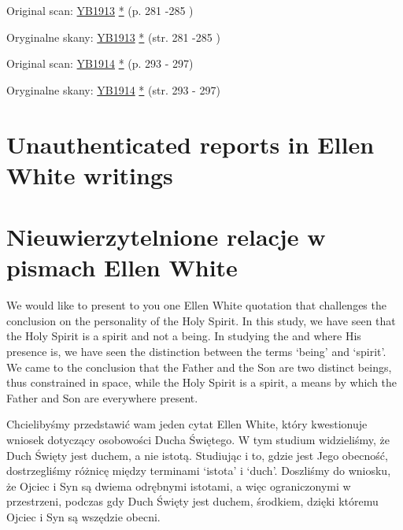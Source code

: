 



Original scan: \href{https://documents.adventistarchives.org/Yearbooks/YB1913.pdf#search=Yearbook%201913}{YB1913} \href{https://forgotten-pillar.s3.us-east-2.amazonaws.com/YB1913.pdf}{*} (p. 281 -285 )


Oryginalne skany: \href{https://documents.adventistarchives.org/Yearbooks/YB1913.pdf#search=Yearbook%201913}{YB1913} \href{https://forgotten-pillar.s3.us-east-2.amazonaws.com/YB1913.pdf}{*} (str. 281 -285 )


Original scan: \href{https://documents.adventistarchives.org/Yearbooks/YB1914.pdf#search=Yearbook%201914}{YB1914} \href{https://forgotten-pillar.s3.us-east-2.amazonaws.com/YB1914.pdf}{*} (p. 293 - 297)


Oryginalne skany: \href{https://documents.adventistarchives.org/Yearbooks/YB1914.pdf#search=Yearbook%201914}{YB1914} \href{https://forgotten-pillar.s3.us-east-2.amazonaws.com/YB1914.pdf}{*} (str. 293 - 297)


\section*{Unauthenticated reports in Ellen White writings}


\section*{Nieuwierzytelnione relacje w pismach Ellen White}


\label{appendix:unauthenticated-reports}
We would like to present to you one Ellen White quotation that challenges the conclusion on the personality of the Holy Spirit. In this study, we have seen that the Holy Spirit is a spirit and not a being. In studying the  and where His presence is, we have seen the distinction between the terms ‘being’ and ‘spirit’. We came to the conclusion that the Father and the Son are two distinct beings, thus constrained in space, while the Holy Spirit is a spirit, a means by which the Father and Son are everywhere present.


\label{appendix:unauthenticated-reports}
Chcielibyśmy przedstawić wam jeden cytat Ellen White, który kwestionuje wniosek dotyczący osobowości Ducha Świętego. W tym studium widzieliśmy, że Duch Święty jest duchem, a nie istotą. Studiując  i to, gdzie jest Jego obecność, dostrzegliśmy różnicę między terminami ‘istota’ i ‘duch’. Doszliśmy do wniosku, że Ojciec i Syn są dwiema odrębnymi istotami, a więc ograniczonymi w przestrzeni, podczas gdy Duch Święty jest duchem, środkiem, dzięki któremu Ojciec i Syn są wszędzie obecni.


